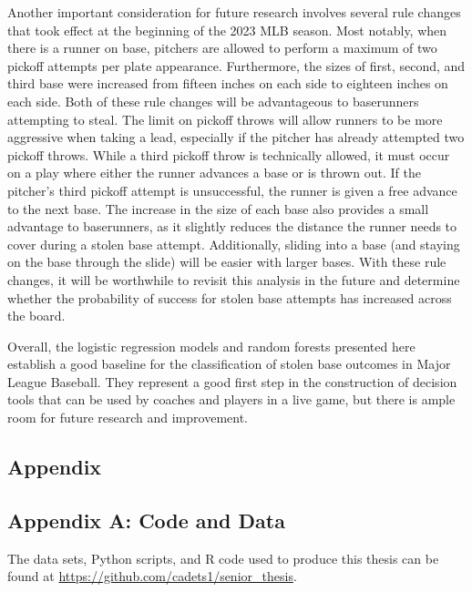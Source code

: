 \documentclass{article}
\begin{document}
Another important consideration for future research involves several rule changes that took effect at the beginning of the 2023 MLB season. Most notably, when there is a runner on base, pitchers are allowed to perform a maximum of two pickoff attempts per plate appearance. Furthermore, the sizes of first, second, and third base were increased from fifteen inches on each side to eighteen inches on each side. Both of these rule changes will be advantageous to baserunners attempting to steal. The limit on pickoff throws will allow runners to be more aggressive when taking a lead, especially if the pitcher has already attempted two pickoff throws. While a third pickoff throw is technically allowed, it must occur on a play where either the runner advances a base or is thrown out. If the pitcher's third pickoff attempt is unsuccessful, the runner is given a free advance to the next base. The increase in the size of each base also provides a small advantage to baserunners, as it slightly reduces the distance the runner needs to cover during a stolen base attempt. Additionally, sliding into a base (and staying on the base through the slide) will be easier with larger bases. With these rule changes, it will be worthwhile to revisit this analysis in the future and determine whether the probability of success for stolen base attempts has increased across the board.

Overall, the logistic regression models and random forests presented here establish a good baseline for the classification of stolen base outcomes in Major League Baseball. They represent a good first step in the construction of decision tools that can be used by coaches and players in a live game, but there is ample room for future research and improvement.



\newpage




\newpage
\begin{center}
    \section*{Appendix}
\end{center}
\appendix

\subsection*{Appendix A: Code and Data}
The data sets, Python scripts, and R code used to produce this thesis can be found at \url{https://github.com/cadets1/senior\_thesis}.
\end{document}
